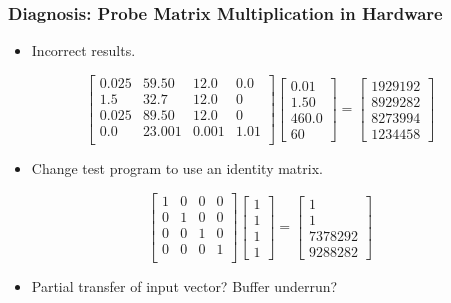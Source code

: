\documentclass[gray]{beamer}
\begin{document}
\begin{frame}
\frametitle{Diagnosis: Probe Matrix Multiplication in Hardware}

\begin{itemize}
\item Incorrect results.
\end{itemize}
\[
\begin{bmatrix}
	0.025 & 59.50 & 12.0 & 0.0 \\
	1.5 & 32.7 & 12.0 & 0 \\
	0.025 & 89.50 & 12.0 & 0 \\
	0.0 & 23.001 & 0.001 & 1.01 \\
\end{bmatrix}
\begin{bmatrix}
	0.01 \\
	1.50 \\
	460.0 \\
	60	
\end{bmatrix}
= 
\begin{bmatrix}
1929192 \\
8929282 \\
8273994 \\
1234458
\end{bmatrix}
\]

\begin{itemize}
\item Change test program to use an identity matrix.
\end{itemize}
\[
\begin{bmatrix}
	1 & 0 & 0 & 0 \\
	0 & 1 & 0 & 0 \\
	0 & 0 & 1 & 0 \\
	0 & 0 & 0 & 1 \\
\end{bmatrix}
\begin{bmatrix}
	1 \\
	1 \\
	1 \\
	1
\end{bmatrix}
= 
\begin{bmatrix}
1 \\
1 \\
7378292 \\
9288282
\end{bmatrix}
\]
\begin{itemize}
\item Partial transfer of input vector?  Buffer underrun?
\end{itemize}
\end{frame}
\end{document}
